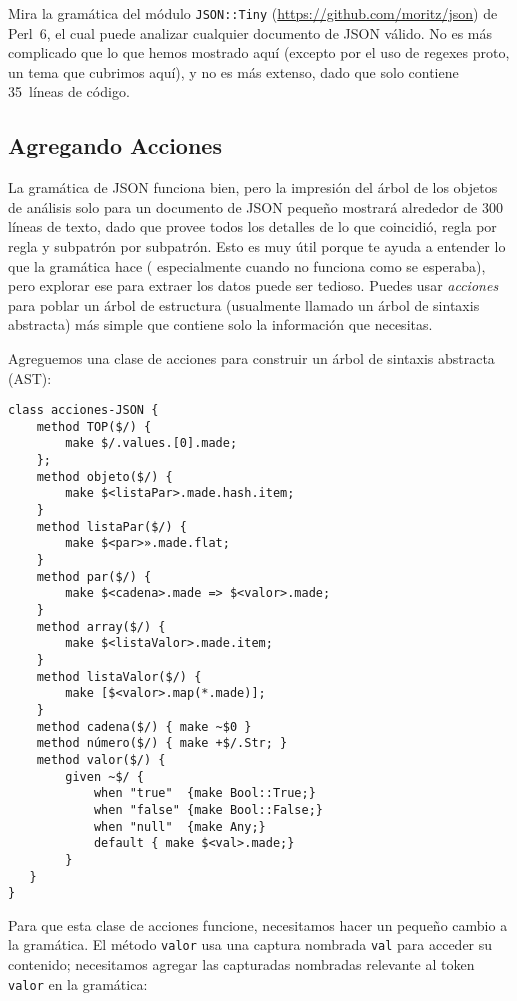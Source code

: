 Mira la gramática del módulo {\tt JSON::Tiny} 
(\url{https://github.com/moritz/json}) de Perl~6,
el cual puede analizar cualquier documento de JSON válido.
No es más complicado que lo que hemos mostrado aquí (excepto
por el uso de regexes proto, un tema que cubrimos aquí),
y no es más extenso, dado que solo contiene 35~líneas de
código.

\subsection{Agregando Acciones}

La gramática de JSON funciona bien, pero la impresión
del árbol de los objetos de análisis solo para un documento
de JSON pequeño mostrará alrededor de 300 líneas de texto,
dado que provee todos los detalles de lo que coincidió, 
regla por regla y subpatrón por subpatrón. Esto es muy útil
porque te ayuda a entender lo que la gramática hace (
especialmente cuando no funciona como se esperaba), 
pero explorar ese para extraer los datos puede ser tedioso.
Puedes usar \emph{acciones} para poblar un árbol de estructura
(usualmente llamado un árbol de sintaxis abstracta) más 
simple que contiene solo la información que necesitas.

Agreguemos una clase de acciones para construir un árbol
de sintaxis abstracta (AST):

\begin{lstlisting}
class acciones-JSON {
    method TOP($/) {
        make $/.values.[0].made;
    };
    method objeto($/) {
        make $<listaPar>.made.hash.item;
    }
    method listaPar($/) {
        make $<par>».made.flat;
    }
    method par($/) {
        make $<cadena>.made => $<valor>.made;
    }
    method array($/) {
        make $<listaValor>.made.item;
    }
    method listaValor($/) {
        make [$<valor>.map(*.made)];
    }
    method cadena($/) { make ~$0 }
    method número($/) { make +$/.Str; }
    method valor($/) { 
        given ~$/ {
            when "true"  {make Bool::True;}
            when "false" {make Bool::False;}
            when "null"  {make Any;}
            default { make $<val>.made;}
        }  
   }
}
\end{lstlisting}

Para que esta clase de acciones funcione, necesitamos hacer un
pequeño cambio a la gramática. El método {\tt valor} usa una
captura nombrada {\tt val} para acceder su contenido; necesitamos
agregar las capturadas nombradas relevante al token {\tt valor}
en la gramática:

